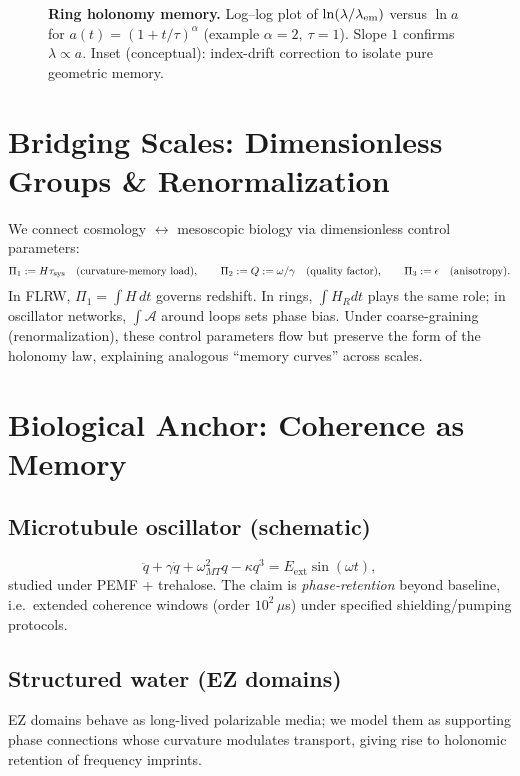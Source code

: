 \documentclass[11pt]{article}
\begin{document}
\begin{figure}[h]
  \centering
  \fbox{\rule{0pt}{1.6in}\rule{0.9\linewidth}{0pt}}
  \caption{\textbf{Ring holonomy memory.} Log--log plot of $\ln(\lambda/\lambda_{\rm em})$ versus $\ln a$ for $a(t)=(1+t/\tau)^\alpha$ (example $\alpha=2,\ \tau=1$).
  Slope $1$ confirms $\lambda\propto a$. Inset (conceptual): index-drift correction to isolate pure geometric memory.}
\end{figure}

\section{Bridging Scales: Dimensionless Groups \& Renormalization}
We connect cosmology $\leftrightarrow$ mesoscopic biology via dimensionless control parameters:
\[
\Pi_1 := H \tau_{\rm sys} \quad (\text{curvature-memory load}),\qquad
\Pi_2 := Q := \omega/\gamma \quad (\text{quality factor}),\qquad
\Pi_3 := \epsilon \quad (\text{anisotropy}).
\]
In FLRW, $\Pi_1=\int H\,dt$ governs redshift. In rings, $\int H_R dt$ plays the same role; in oscillator networks, $\int \mathcal{A}$ around loops sets phase bias. Under coarse-graining (renormalization), these control parameters flow but preserve the form of the holonomy law, explaining analogous ``memory curves'' across scales.

\section{Biological Anchor: Coherence as Memory}
\subsection*{Microtubule oscillator (schematic)}
\[
\ddot{q} + \gamma \dot{q} + \omega_{MT}^2 q - \kappa q^3 = E_{\text{ext}}\sin(\omega t),
\]
studied under PEMF + trehalose. The claim is \emph{phase-retention} beyond baseline, i.e.\ extended coherence windows (order $10^2\,\mu$s) under specified shielding/pumping protocols.

\subsection*{Structured water (EZ domains)}
EZ domains behave as long-lived polarizable media; we model them as supporting phase connections whose curvature modulates transport, giving rise to holonomic retention of frequency imprints.
\end{document}
